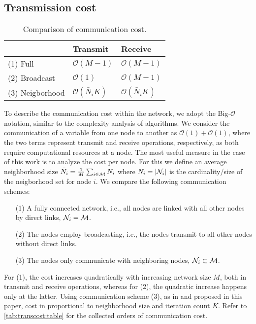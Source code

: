 \documentclass{article}
\begin{document}
\subsection[]{Transmission cost}
\label{sec:transcost}
\begin{table}[t]
    \centering
    \begin{tabular}{ |l|l|l| } 
        \hline
        & Transmit & Receive \\
        \hline\hline
        (1) Full & \(\mathcal{O}(M-1)\) & \(\mathcal{O}(M-1)\) \\
        \hline
        (2) Broadcast & \(\mathcal{O}(1)\) & \(\mathcal{O}(M-1)\) \\ 
        \hline
        (3) Neigborhood & \(\mathcal{O}(\bar{N}_i K)\) & \(\mathcal{O}(\bar{N}_i K)\) \\ 
        \hline
    \end{tabular}
    \caption[]{Comparison of communication cost.}
    \label{tab:transcost:table}
\end{table}
To describe the communication cost within the network, we adopt the Big-\(\mathcal{O}\) notation, similar to the complexity analysis of algorithms.
We consider the communication of a variable from one node to another as \(\mathcal{O}(1)+\mathcal{O}(1)\), where the two terms represent transmit and receive operations, respectively, as both require computational resources at a node.
The most useful measure in the case of this work is to analyze the cost per node.
For this we define an average neighborhood size \(\bar{N}_i = \frac{1}{M} \sum_{i \in \mathcal{M}} N_i\) where \(N_i = | \mathcal{N}_i |\) is the cardinality/size of the neigborhood set for node \(i\).
We compare the following communication schemes:
\begin{itemize}
    \itemsep-0.2em
    \item[(1)] A fully connected network, i.e., all nodes are linked with all other nodes by direct links, \(\mathcal{N}_i = \mathcal{M}\).
    \item[(2)] The nodes employ broadcasting, i.e., the nodes transmit to all other nodes without direct links.
    \item[(3)] The nodes only communicate with neighboring nodes, \(\mathcal{N}_i \subset \mathcal{M}\).
\end{itemize}
For (1), the cost increases quadratically with increasing network size \(M\), both in transmit and receive operations, whereas for (2), the quadratic increase happens only at the latter.
Using communication scheme (3), as in \cite{yuDistributedBlindSystem2014,liuDistributedBlindIdentification2016} and proposed in this paper, cost in proportional to neighborhood size and iteration count \(K\).
Refer to \autoref{tab:transcost:table} for the collected orders of communication cost.
\end{document}
